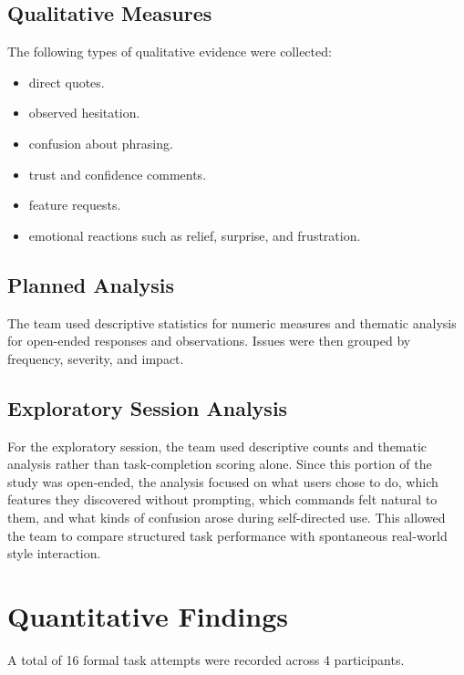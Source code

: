 \documentclass[12pt, titlepage]{article}
\begin{document}
\subsection{Qualitative Measures}

The following types of qualitative evidence were collected:
\begin{itemize}
    \item direct quotes.
    \item observed hesitation.
    \item confusion about phrasing.
    \item trust and confidence comments.
    \item feature requests.
    \item emotional reactions such as relief, surprise, and frustration.
\end{itemize}

\subsection{Planned Analysis}

The team used descriptive statistics for numeric measures and thematic
analysis for open-ended responses and observations. Issues were then
grouped by frequency, severity, and impact.

\subsection{Exploratory Session Analysis}

For the exploratory session, the team used descriptive counts and
thematic analysis rather than task-completion scoring alone. Since this
portion of the study was open-ended, the analysis focused on what users
chose to do, which features they discovered without prompting, which
commands felt natural to them, and what kinds of confusion arose during
self-directed use. This allowed the team to compare structured task
performance with spontaneous real-world style interaction.

\section{Quantitative Findings}

A total of 16 formal task attempts were recorded across 4 participants.
\end{document}

